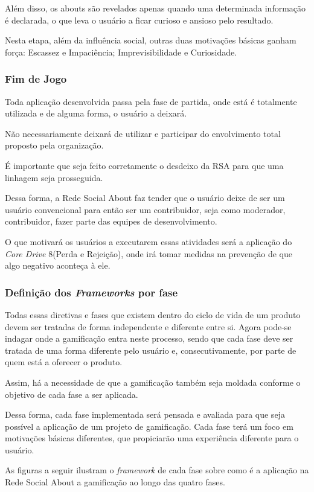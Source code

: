 Além disso, os abouts são revelados apenas quando uma determinada informação
é declarada, o que leva o usuário a ficar curioso e ansioso pelo resultado. 

Nesta etapa, além da influência social, outras duas motivações básicas ganham 
força: Escassez e Impaciência; Imprevisibilidade e Curiosidade.

\subsubsection{Fim de Jogo}
\label{sub:fim_de_jogo}
Toda aplicação desenvolvida passa pela fase de partida, onde está é totalmente utilizada
e de alguma forma, o usuário a deixará. 

Não necessariamente deixará de utilizar e participar do envolvimento total proposto pela
organização.

É importante que seja feito corretamente o desdeixo da RSA para que uma linhagem seja
prosseguida.

Dessa forma, a Rede Social About faz tender que o usuário deixe de ser um usuário
convencional para então ser um contribuidor,  seja como moderador, contribuidor,
fazer parte das equipes de desenvolvimento.

O que motivará os usuários a executarem essas atividades será a aplicação 
do \textit{Core Drive} 8(Perda e Rejeição), onde  irá tomar medidas na prevenção de
que algo negativo aconteça à ele.


\subsubsection{Definição dos \textit{Frameworks} por fase}
\label{sub:fim_de_jogo}
Todas essas diretivas e fases que existem dentro do ciclo de vida de um produto devem ser
tratadas de forma independente e diferente entre si. Agora pode-se indagar onde a gamificação
entra neste processo, sendo que cada fase deve ser tratada de uma forma diferente pelo
usuário e, consecutivamente, por parte de quem está a oferecer o produto.

Assim, há a necessidade de que a gamificação também seja moldada conforme o objetivo de
cada fase a ser aplicada.

Dessa forma, cada fase implementada será pensada e avaliada para que seja possível a
aplicação de um  projeto de gamificação. Cada fase terá um foco em motivações
básicas diferentes, que propiciarão uma experiência diferente para o usuário.

As figuras a seguir ilustram o \textit{framework} de cada fase sobre como é a aplicação na
Rede Social About a gamificação ao longo das quatro fases.

